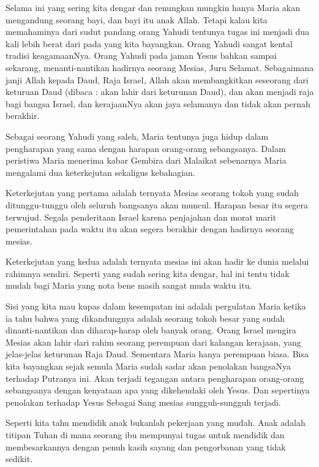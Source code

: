 Selama ini yang sering kita dengar dan renungkan mungkin hanya Maria akan mengandung seorang bayi, dan bayi itu anak Allah. Tetapi kalau kita memahaminya dari sudut pandang orang Yahudi tentunya tugas ini menjadi dua kali lebih berat dari pada yang kita bayangkan. Orang Yahudi sangat kental tradisi keagamaanNya. Orang Yahudi pada jaman Yesus bahkan sampai sekarang, menanti-nantikan hadirnya seorang Mesias, Juru Selamat. Sebagaimana janji Allah kepada Daud, Raja Israel, Allah akan membangkitkan seseorang dari keturuan Daud (dibaca : akan lahir dari keturunan Daud), dan akan menjadi raja bagi bangsa Israel, dan kerajaanNya akan jaya selamanya dan tidak akan pernah berakhir.

Sebagai seorang Yahudi yang saleh, Maria tentunya juga hidup dalam pengharapan yang sama dengan harapan orang-orang sebangsanya. Dalam peristiwa Maria menerima kabar Gembira dari Malaikat sebenarnya Maria mengalami dua keterkejutan sekaligus kebahagian.
\normalsize

Keterkejutan yang pertama adalah ternyata Mesias seorang tokoh yang sudah ditunggu-tunggu oleh seluruh bangsanya akan muncul. Harapan besar itu segera terwujud. Segala penderitaan Israel karena penjajahan dan morat marit pemerintahan pada waktu itu akan segera berakhir dengan hadirnya seorang mesias.

Keterkejutan yang kedua adalah ternyata mesias ini akan hadir ke dunia melalui rahimnya sendiri. Seperti yang sudah sering kita dengar, hal ini tentu tidak mudah bagi Maria yang nota bene masih sangat muda waktu itu.

Sisi yang kita mau kupas dalam kesempatan ini adalah pergulatan Maria ketika ia tahu bahwa yang dikandungnya adalah seorang tokoh besar yang sudah dinanti-nantikan dan diharap-harap oleh banyak orang. Orang Israel mengira Mesias akan lahir dari rahim seorang perempuan dari kalangan kerajaan, yang jelas-jelas keturunan Raja Daud. Sementara Maria hanya perempuan biasa. Bisa kita bayangkan sejak semula Maria sudah sadar akan penolakan bangsaNya terhadap Putranya ini. Akan terjadi tegangan antara pengharapan orang-orang sebangsanya dengan kenyataan apa yang dikehendaki oleh Yesus. Dan sepertinya penolakan terhadap Yesus Sebagai Sang mesias sungguh-sungguh terjadi.

Seperti kita tahu mendidik anak bukanlah pekerjaan yang mudah. Anak adalah titipan Tuhan di mana seorang ibu mempunyai tugas untuk mendidik dan membesarkannya dengan penuh kasih sayang dan pengorbanan yang tidak sedikit.

